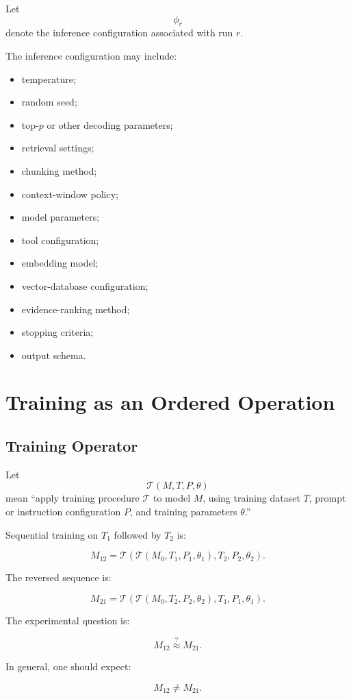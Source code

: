 \documentclass[11pt]{report}
\newcommand{\Tcal}{\mathcal{T}}
\begin{document}
Let
\[
\phi_r
\]
denote the inference configuration associated with run $r$.

The inference configuration may include:

\begin{itemize}
  \item temperature;
  \item random seed;
  \item top-$p$ or other decoding parameters;
  \item retrieval settings;
  \item chunking method;
  \item context-window policy;
  \item model parameters;
  \item tool configuration;
  \item embedding model;
  \item vector-database configuration;
  \item evidence-ranking method;
  \item stopping criteria;
  \item output schema.
\end{itemize}

\chapter{Training as an Ordered Operation}

\section{Training Operator}

Let
\[
\Tcal(M,T,P,\theta)
\]
mean ``apply training procedure $\Tcal$ to model $M$, using training dataset $T$, prompt or instruction configuration $P$, and training parameters $\theta$.''

Sequential training on $T_1$ followed by $T_2$ is:

\[
M_{12}
=
\Tcal\left(
    \Tcal(M_0,T_1,P_1,\theta_1),
    T_2,P_2,\theta_2
\right).
\]

The reversed sequence is:

\[
M_{21}
=
\Tcal\left(
    \Tcal(M_0,T_2,P_2,\theta_2),
    T_1,P_1,\theta_1
\right).
\]

The experimental question is:

\[
M_{12}\stackrel{?}{\approx}M_{21}.
\]

In general, one should expect:

\[
M_{12}\ne M_{21}.
\]
\end{document}
